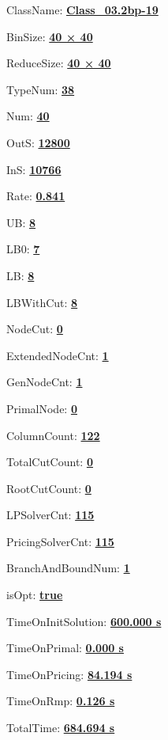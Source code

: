 \documentclass[11pt]{article}
\begin{document}
\pagestyle{empty}


ClassName: \underline{\textbf{Class_03.2bp-19}}
\par
BinSize: \underline{\textbf{40 × 40}}
\par
ReduceSize: \underline{\textbf{40 × 40}}
\par
TypeNum: \underline{\textbf{38}}
\par
Num: \underline{\textbf{40}}
\par
OutS: \underline{\textbf{12800}}
\par
InS: \underline{\textbf{10766}}
\par
Rate: \underline{\textbf{0.841}}
\par
UB: \underline{\textbf{8}}
\par
LB0: \underline{\textbf{7}}
\par
LB: \underline{\textbf{8}}
\par
LBWithCut: \underline{\textbf{8}}
\par
NodeCut: \underline{\textbf{0}}
\par
ExtendedNodeCnt: \underline{\textbf{1}}
\par
GenNodeCnt: \underline{\textbf{1}}
\par
PrimalNode: \underline{\textbf{0}}
\par
ColumnCount: \underline{\textbf{122}}
\par
TotalCutCount: \underline{\textbf{0}}
\par
RootCutCount: \underline{\textbf{0}}
\par
LPSolverCnt: \underline{\textbf{115}}
\par
PricingSolverCnt: \underline{\textbf{115}}
\par
BranchAndBoundNum: \underline{\textbf{1}}
\par
isOpt: \underline{\textbf{true}}
\par
TimeOnInitSolution: \underline{\textbf{600.000 s}}
\par
TimeOnPrimal: \underline{\textbf{0.000 s}}
\par
TimeOnPricing: \underline{\textbf{84.194 s}}
\par
TimeOnRmp: \underline{\textbf{0.126 s}}
\par
TotalTime: \underline{\textbf{684.694 s}}
\par
\newpage


\end{document}
